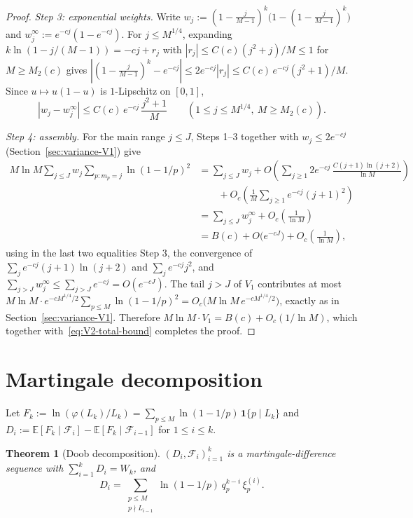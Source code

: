 \documentclass[11pt]{article}
\newtheorem{theorem}{Theorem}
\theoremstyle{remark}
\newcommand{\EE}{\mathbb{E}}
\newcommand{\F}{\mathcal{F}}
\newcommand{\one}{\mathbf{1}}
\begin{document}
\begin{proof}
\emph{Step 3: exponential weights.} Write $w_j := (1 - \tfrac{j}{M-1})^k \bigl(1 - (1 - \tfrac{j}{M-1})^k\bigr)$ and $w_j^\infty := e^{-cj}(1 - e^{-cj})$. For $j \leq M^{1/4}$, expanding $k \ln(1 - j/(M-1)) = -cj + r_j$ with $|r_j| \leq C(c)(j^2 + j)/M \leq 1$ for $M \geq M_2(c)$ gives $|(1 - \tfrac{j}{M-1})^k - e^{-cj}| \leq 2 e^{-cj} |r_j| \leq C(c)\, e^{-cj} (j^2+1)/M$. Since $u \mapsto u(1-u)$ is $1$-Lipschitz on $[0,1]$,
\[
|w_j - w_j^\infty| \leq C(c)\, e^{-cj}\, \frac{j^2 + 1}{M}
\qquad (1 \leq j \leq M^{1/4},\ M \geq M_2(c)).
\]

\emph{Step 4: assembly.} For the main range $j \leq J$, Steps 1--3 together with $w_j \leq 2 e^{-cj}$ (Section~\ref{sec:variance-V1}) give
\begin{align*}
M \ln M \sum_{j \leq J} w_j \sum_{p \colon m_p = j} \ln(1 - 1/p)^2
&= \sum_{j \leq J} w_j
+ O\!\left( \sum_{j \geq 1} 2 e^{-cj}\, \frac{C (j+1) \ln(j+2)}{\ln M} \right) \\
&\qquad {}+ O_c\!\left( \frac{1}{M} \sum_{j \geq 1} e^{-cj} (j+1)^2 \right) \\
&= \sum_{j \leq J} w_j^\infty + O_c\!\left( \frac{1}{\ln M} \right) \\
&= B(c) + O\bigl(e^{-cJ}\bigr) + O_c\!\left( \frac{1}{\ln M} \right),
\end{align*}
using in the last two equalities Step 3, the convergence of $\sum_j e^{-cj}(j+1)\ln(j+2)$ and $\sum_j e^{-cj} j^2$, and $\sum_{j > J} w_j^\infty \leq \sum_{j > J} e^{-cj} = O(e^{-cJ})$. The tail $j > J$ of $V_1$ contributes at most $M \ln M \cdot e^{-cM^{1/4}/2} \sum_{p \leq M} \ln(1-1/p)^2 = O_c\bigl(M \ln M\, e^{-cM^{1/4}/2}\bigr)$, exactly as in Section~\ref{sec:variance-V1}. Therefore $M \ln M \cdot V_1 = B(c) + O_c(1/\ln M)$, which together with~\eqref{eq:V2-total-bound} completes the proof.
\end{proof}

\section{Martingale decomposition}\label{sec:martingale}

Let $F_k := \ln(\varphi(L_k)/L_k) = \sum_{p \leq M} \ln(1 - 1/p)\, \one\{p \mid L_k\}$ and $D_i := \EE[F_k \mid \F_i] - \EE[F_k \mid \F_{i-1}]$ for $1 \leq i \leq k$.

\begin{theorem}[Doob decomposition]\label{thm:doob}
$(D_i, \F_i)_{i=1}^k$ is a martingale-difference sequence with $\sum_{i=1}^k D_i = W_k$, and
\begin{equation}\label{eq:Di}
D_i = \sum_{\substack{p \leq M \\ p \nmid L_{i-1}}} \ln(1 - 1/p)\, q_p^{k-i}\, \xi_p^{(i)}.
\end{equation}
\end{theorem}
\end{document}
